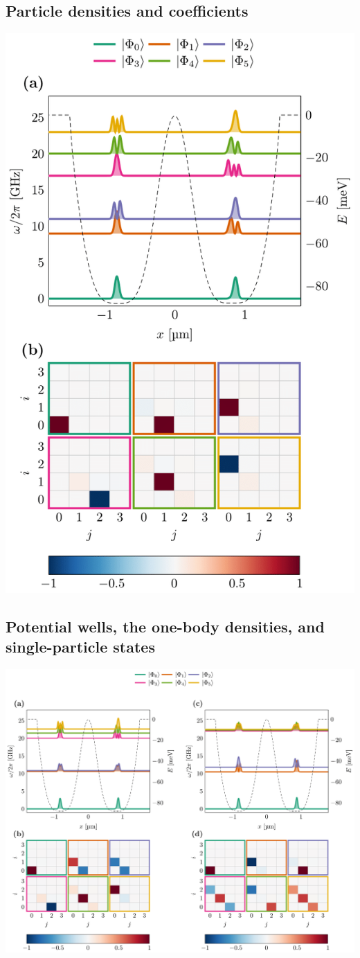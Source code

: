 \documentclass[%
oneside,                 %
final,                   %
10pt]{article}
\begin{document}
\noindent
\subsection{Particle densities and coefficients}

\vspace{6mm}

\centerline{\includegraphics[width=0.7\linewidth]{qcfigures/configuration_I-1.png}}

\vspace{6mm}

\subsection{Potential wells, the one-body densities, and single-particle states}

\vspace{6mm}

\centerline{\includegraphics[width=0.7\linewidth]{qcfigures/configuration_II_and_III-1.png}}
\end{document}
